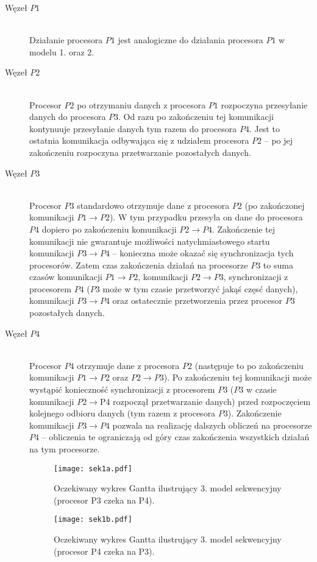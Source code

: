 \begin{description}

\item[Węzeł $P1$] \hfill \\

Działanie procesora $P1$ jest analogiczne do działania procesora $P1$ w modelu 1. oraz 2.

\item[Węzeł $P2$] \hfill \\

Procesor $P2$ po otrzymaniu danych z procesora $P1$ rozpoczyna przesyłanie danych do procesora $P3$. Od razu po zakończeniu tej komunikacji kontynuuje przesyłanie danych tym razem do procesora $P4$. Jest to ostatnia komunikacja odbywająca się z udziałem procesora $P2$ -- po jej zakończeniu rozpoczyna przetwarzanie pozostałych danych.
 
\item[Węzeł $P3$] \hfill \\

Procesor $P3$ standardowo otrzymuje dane z procesora $P2$ (po zakończonej komunikacji $P1 \to P2$). W tym przypadku przesyła on dane do procesora $P4$ dopiero po zakończeniu komunikacji $P2 \to P4$. Zakończenie tej komunikacji nie gwarantuje możliwości natychmiastowego startu komunikacji $P3 \to P4$ -- konieczna może okazać się synchronizacja tych procesorów. Zatem czas zakończenia działań na procesorze $P3$ to suma czasów komunikacji $P1 \to P2$, komunikacji $P2 \to P3$, synchronizacji z procesorem $P4$ ($P3$ może w tym czasie przetworzyć jakąś częsć danych), komunikacji $P3 \to P4$ oraz ostatecznie przetworzenia przez procesor $P3$ pozostałych danych.

\item[Węzeł $P4$] \hfill \\

Procesor $P4$ otrzymuje dane z procesora $P2$ (następuje to po zakończeniu komunikacji $P1 \to P2$ oraz $P2 \to P3$). Po zakończeniu tej komunikacji może wystąpić konieczność synchronizacji z procesorem $P3$ ($P3$ w czasie komunikacji $P2 \to $P4 rozpoczął przetwarzanie danych) przed rozpoczęciem kolejnego odbioru danych (tym razem z procesora $P3$). Zakończenie komunikacji $P3 \to P4$ pozwala na realizację dalszych obliczeń na procesorze $P4$ -- obliczenia te ograniczają od góry czas zakończenia wszystkich działań na tym procesorze. 

\begin{figure}[H]
\centering
\texttt{[image: sek1a.pdf]}
\caption{Oczekiwany wykres Gantta ilustrujący 3. model sekwencyjny (procesor P3 czeka na P4).}
\label{fig:seq3a}
\end{figure}

\begin{figure}[H]
\centering
\texttt{[image: sek1b.pdf]}
\caption{Oczekiwany wykres Gantta ilustrujący 3. model sekwencyjny (procesor P4 czeka na P3).}
\label{fig:seq3b}
\end{figure}

\end{description}

